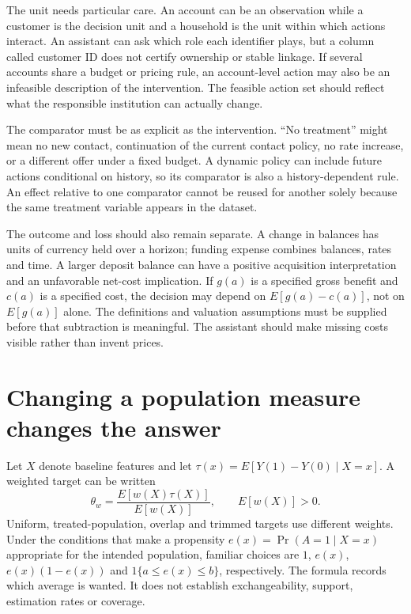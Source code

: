 The unit needs particular care. An account can be an observation while a
customer is the decision unit and a household is the unit within which actions
interact. An assistant can ask which role each identifier plays, but a column
called customer ID does not certify ownership or stable linkage. If several
accounts share a budget or pricing rule, an account-level action may also be
an infeasible description of the intervention. The feasible action set should
reflect what the responsible institution can actually change.

The comparator must be as explicit as the intervention. ``No treatment'' might
mean no new contact, continuation of the current contact policy, no rate
increase, or a different offer under a fixed budget. A dynamic policy can
include future actions conditional on history, so its comparator is also a
history-dependent rule. An effect relative to one comparator cannot be
reused for another solely because the same treatment variable appears in the
dataset.

The outcome and loss should also remain separate. A change in balances has
units of currency held over a horizon; funding expense combines balances,
rates and time. A larger deposit balance can have a positive acquisition
interpretation and an unfavorable net-cost implication. If \(g(a)\) is a
specified gross benefit and \(c(a)\) is a specified cost, the decision may
depend on \(E[g(a)-c(a)]\), not on \(E[g(a)]\) alone. The definitions and
valuation assumptions must be supplied before that subtraction is meaningful.
The assistant should make missing costs visible rather than invent prices.

\section{Changing a population measure changes the answer}

Let \(X\) denote baseline features and let
\(\tau(x)=E[Y(1)-Y(0)\mid X=x]\). A weighted target can be written
\begin{equation}
 \theta_w=\frac{E[w(X)\tau(X)]}{E[w(X)]},\qquad E[w(X)]>0.
 \label{la:weighted-target}
\end{equation}
Uniform, treated-population, overlap and trimmed targets use different
weights. Under the conditions that make a propensity \(e(x)=\Pr(A=1\mid X=x)\)
appropriate for the intended population, familiar choices are \(1\),
\(e(x)\), \(e(x)(1-e(x))\) and
\(1\{a\leq e(x)\leq b\}\), respectively. The formula records which average
is wanted. It does not establish exchangeability, support, estimation rates
or coverage.

